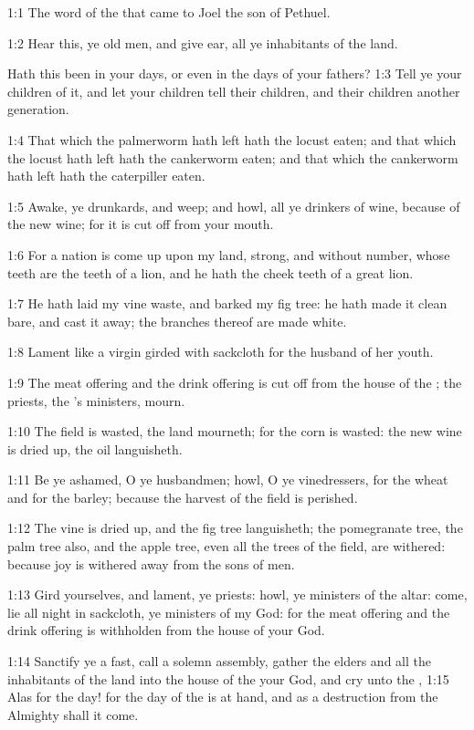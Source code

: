 

1:1 The word of the \LORD that came to Joel the son of Pethuel.

1:2 Hear this, ye old men, and give ear, all ye inhabitants of the land.

Hath this been in your days, or even in the days of your fathers?  1:3 Tell ye your children of it, and let your children tell their children, and their children another generation.

1:4 That which the palmerworm hath left hath the locust eaten; and that which the locust hath left hath the cankerworm eaten; and that which the cankerworm hath left hath the caterpiller eaten.

1:5 Awake, ye drunkards, and weep; and howl, all ye drinkers of wine, because of the new wine; for it is cut off from your mouth.

1:6 For a nation is come up upon my land, strong, and without number, whose teeth are the teeth of a lion, and he hath the cheek teeth of a great lion.

1:7 He hath laid my vine waste, and barked my fig tree: he hath made it clean bare, and cast it away; the branches thereof are made white.

1:8 Lament like a virgin girded with sackcloth for the husband of her youth.

1:9 The meat offering and the drink offering is cut off from the house of the \LORD; the priests, the \LORD's ministers, mourn.

1:10 The field is wasted, the land mourneth; for the corn is wasted: the new wine is dried up, the oil languisheth.

1:11 Be ye ashamed, O ye husbandmen; howl, O ye vinedressers, for the wheat and for the barley; because the harvest of the field is perished.

1:12 The vine is dried up, and the fig tree languisheth; the pomegranate tree, the palm tree also, and the apple tree, even all the trees of the field, are withered: because joy is withered away from the sons of men.

1:13 Gird yourselves, and lament, ye priests: howl, ye ministers of the altar: come, lie all night in sackcloth, ye ministers of my God: for the meat offering and the drink offering is withholden from the house of your God.

1:14 Sanctify ye a fast, call a solemn assembly, gather the elders and all the inhabitants of the land into the house of the \LORD your God, and cry unto the \LORD, 1:15 Alas for the day! for the day of the \LORD is at hand, and as a destruction from the Almighty shall it come.

